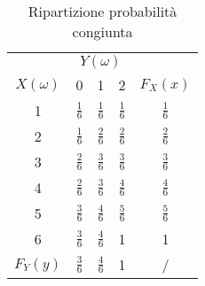 \begin{center}
	\begin{table}[H]
		\begin{center}
			\begin{tabular}{|c|ccc|c|}
				\hline
				            & \multicolumn{3}{c|}{$Y(\omega)$} &                                               \\
				$X(\omega)$ & 0                                & 1             & 2             & $F_X(x)$      \\
				\hline 1    & $\frac{1}{6}$                    & $\frac{1}{6}$ & $\frac{1}{6}$ & $\frac{1}{6}$ \\[5pt]
				2           & $\frac{1}{6}$                    & $\frac{2}{6}$ & $\frac{2}{6}$ & $\frac{2}{6}$ \\[5pt]
				3           & $\frac{2}{6}$                    & $\frac{3}{6}$ & $\frac{3}{6}$ & $\frac{3}{6}$ \\[5pt]
				4           & $\frac{2}{6}$                    & $\frac{3}{6}$ & $\frac{4}{6}$ & $\frac{4}{6}$ \\[5pt]
				5           & $\frac{3}{6}$                    & $\frac{4}{6}$ & $\frac{5}{6}$ & $\frac{5}{6}$ \\[5pt]
				6           & $\frac{3}{6}$                    & $\frac{4}{6}$ & 1             & 1             \\[5pt]
				\hline
				$F_Y(y)$    & $\frac{3}{6}$                    & $\frac{4}{6}$ & 1             & /             \\[5pt]
				\hline
			\end{tabular}
		\end{center}
		\caption{Ripartizione probabilità congiunta}
	\end{table}
\end{center}

